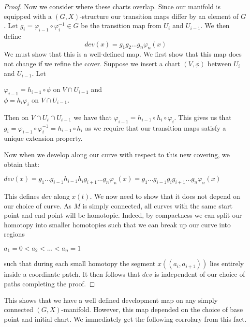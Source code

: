 \begin{proof}
    Now we consider where these charts overlap. Since our manifold is equipped with
    a $(G,X)$-structure our transition maps differ by an element of $G$. Let $g_i =
        \varphi_{i-1}\circ\varphi^{-1}_i \in G$ be the transition map from $U_i$ and
    $U_{i-1}$. We then define $$ dev(x) = g_1g_2\dots g_n \varphi_n(x) $$ We must
    show that this is a well-defined map. We first show that this map does not
    change if we refine the cover. Suppose we insert a chart $(V, \phi)$ between
    $U_i$ and $U_{i-1}$. Let
    \begin{center}
        $\varphi_{i-1} = h_{i-1}\circ\phi$ on $V \cap U_{i-1}$ and \\
        $\phi = h_i\varphi_{i}$ on $V \cap U_{i-1}$.
    \end{center}
    Then on $V \cap U_i \cap U_{i-1}$ we have that $\varphi_{i-1} = h_{i-1}\circ h_i \circ \varphi_{i}$. This gives us that $g_i = \varphi_{i-1}\circ \varphi^{-1}_i = h_{i-1} \circ h_i$ as we require that our transition maps satisfy a unique extension property.

    Now when we develop along our curve with respect to this new covering, we
    obtain that:

    \begin{center}
        $dev(x) = g_1 \dots g_{i-1}h_{i-1}h_{i}g_{i+1}\dots g_n\varphi_n(x) = g_1 \dots g_{i-1}g_ig_{i+1}\dots g_n\varphi_n(x)$
    \end{center}

    This defines $dev$ along $x(t)$. We now need to show that it does not depend on
    our choice of curve. As $M$ is simply connected, all curves with the same start
    point and end point will be homotopic. Indeed, by compactness we can split our
    homotopy into smaller homotopies such that we can break up our curve into
    regions
    \begin{center}
        $a_1 =0 < a_2 < \dots < a_n=1$
    \end{center}
    such that during each small homotopy the segment $x((a_i, a_{i+1}))$ lies entirely inside a coordinate patch. It then follows that $dev$ is independent of our choice of paths completing the proof.

\end{proof}

This shows that we have a well defined development map on any simply connected
$(G,X)$-manifold. However, this map depended on the choice of base point and
initial chart. We immediately get the following corrolary from this fact.

